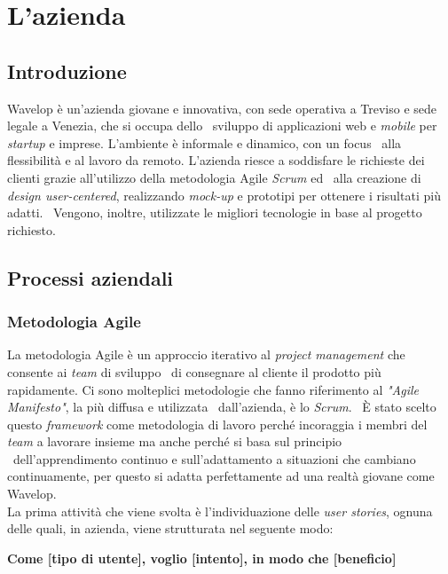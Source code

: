 
\chapter{L'azienda}
\label{cap:azienda}
\section{Introduzione}
Wavelop è un’azienda giovane e innovativa, con sede operativa a Treviso e sede legale a Venezia, che si occupa dello \
sviluppo di applicazioni web e \emph{mobile} per \emph{startup} e imprese. L’ambiente è informale e dinamico, con un focus \
alla flessibilità e al lavoro da remoto. L’azienda riesce a soddisfare le richieste dei clienti grazie all’utilizzo della metodologia Agile \emph{Scrum} ed \
alla creazione di \emph{design user-centered}, realizzando \emph{\gls{mock-up}} e prototipi per ottenere i risultati più adatti. \
Vengono, inoltre, utilizzate le migliori tecnologie in base al progetto richiesto.

\section{Processi aziendali}

\subsection{Metodologia Agile}
La metodologia Agile è un approccio iterativo al \emph{project management} che consente ai \emph{team} di sviluppo \
di consegnare al cliente il prodotto più rapidamente. Ci sono molteplici metodologie che fanno riferimento al \emph{"Agile Manifesto"}, la più diffusa e utilizzata \
dall'azienda, è lo \emph{Scrum}. \
È stato scelto questo \emph{framework} come metodologia di lavoro perché incoraggia i membri del \emph{team} a lavorare insieme ma anche perché si basa sul principio \
dell'apprendimento continuo e sull'adattamento a situazioni che cambiano continuamente, per questo si adatta perfettamente ad una realtà giovane come Wavelop. \\

La prima attività che viene svolta è l'individuazione delle \emph{user stories}, ognuna delle quali, in azienda, viene strutturata nel seguente modo:
\begin{center}
  \textbf{Come [tipo di utente], voglio [intento], in modo che [beneficio]}
\end{center}

